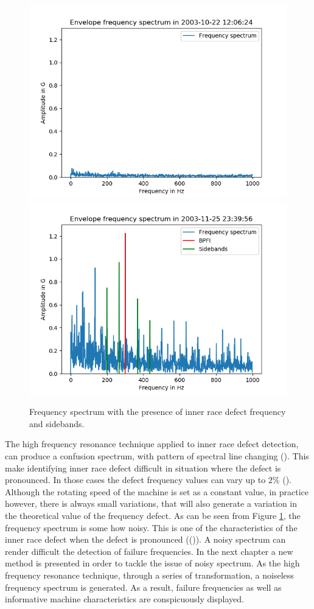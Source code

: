 \documentclass[../Main/thesis.tex]{subfiles}
\begin{document}
\begin{figure}[H]
	\centering
	\includegraphics[width=0.7\linewidth]{../fig/bpfi/first_day_spectrum}
	\includegraphics[width=0.7\linewidth]{../fig/bpfi/bpfi_sidebands}
	\caption{Frequency spectrum with the presence of inner race defect frequency and sidebands.}
	\label{fig:bpfi}
\end{figure}
\justify
The high frequency resonance technique applied to inner race defect detection, can produce a confusion spectrum, with pattern of spectral line changing (\cite{mcfadden1984a}). This make identifying inner race defect difficult in situation where the defect is pronounced. In those cases the defect frequency values can vary up to $2\%$ (\cite{randal2010}). Although the rotating speed of the machine is set as a constant value, in practice however, there is always small variations, that will also generate a variation in the theoretical value of the frequency defect. As can be seen from Figure \ref{fig:bpfi}, the frequency spectrum is some how noisy. This is one of the characteristics of the inner race defect when the defect is pronounced ((\cite{mcfadden1984a})). A noisy spectrum can render difficult the detection of failure frequencies.
\justify
In the next chapter a new method is presented in order to tackle the issue of noisy spectrum. As the high frequency resonance technique, through a series of transformation, a noiseless frequency spectrum is generated. As a result,  failure frequencies as well as informative machine characteristics are conspicuously displayed.
\end{document}
